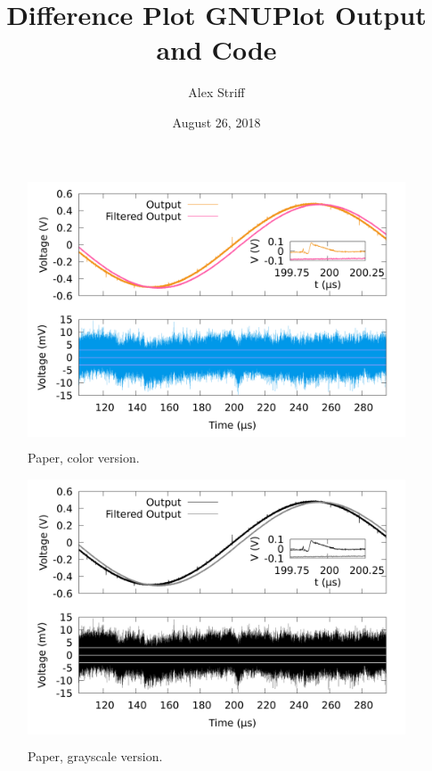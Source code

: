 \documentclass[11pt,letterpaper]{article}
\title{Difference Plot GNUPlot Output and Code}
\author{Alex Striff}
\date{August 26, 2018}
\begin{document}
\maketitle

\begin{figure}[H]
  \centering
  \colorbox{white}{%
    \includegraphics[width=\linewidth]{../diffplot-pc.png}
  }
  \caption{Paper, color version.}
\end{figure}
\begin{figure}[H]
  \centering
  \colorbox{white}{%
    \includegraphics[width=\linewidth]{../diffplot-pg.png}
  }
  \caption{Paper, grayscale version.}
\end{figure}
\end{document}
